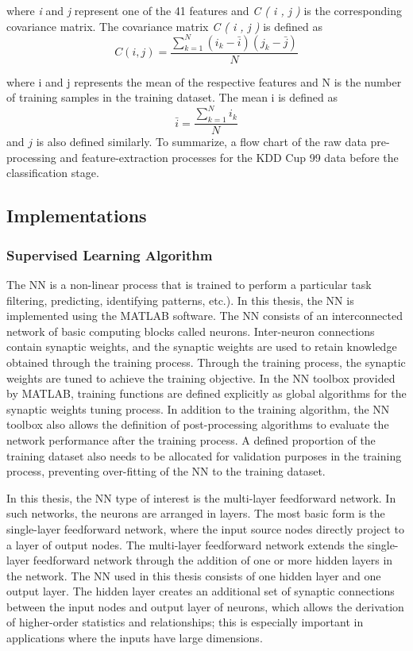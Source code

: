 \documentclass[12pt]{article}
\theoremstyle{definition}
\begin{document}
			where \emph{i} and \emph{j} represent one of the 41 features and \emph{C ( i , j )} is the corresponding covariance matrix. The covariance matrix \emph{C ( i , j )} is defined as
			\begin{equation}
				C(i,j) = \frac{\sum_{k=1}^{N}(i_{k}-\bar{i})(j_{k} - \bar{j})}{N}
			\end{equation}
			
			where i and j represents the mean of the respective features and N is the number of training samples in the training dataset. The mean i is defined as
			\begin{equation}
				\bar{i} = \frac{\sum_{k=1}^{N}i_{k}}{N}
			\end{equation}
			and $j$ is also defined similarly. To summarize, a flow chart of the raw data pre-processing and feature-extraction processes for the KDD Cup 99 data before the classification stage.
			
		\subsection{Implementations}
			\subsubsection{Supervised Learning Algorithm}
			
			The NN is a non-linear process that is trained to perform a particular task filtering, predicting, identifying patterns, etc.). In this thesis, the NN is implemented using the MATLAB software.
			The NN consists of an interconnected network of basic computing blocks called
			neurons. Inter-neuron connections contain synaptic weights, and the synaptic weights are
			used to retain knowledge obtained through the training process. Through the training
			process, the synaptic weights are tuned to achieve the training objective. In the NN
			toolbox provided by MATLAB, training functions are defined explicitly as global
			algorithms for the synaptic weights tuning process. In addition to the training algorithm,
			the NN toolbox also allows the definition of post-processing algorithms to evaluate the
			network performance after the training process. A defined proportion of the training
			dataset also needs to be allocated for validation purposes in the training process,
			preventing over-fitting of the NN to the training dataset.
			
			In this thesis, the NN type of interest is the multi-layer feedforward network. In such networks, the neurons are arranged in layers. The most basic form is the single-layer feedforward network, where the input source nodes directly project to a layer of output nodes. The multi-layer feedforward network extends the single-layer feedforward network through the addition of one or more hidden layers in the network. The NN used in this thesis consists of one hidden layer and one output layer. The hidden layer creates an additional set of synaptic connections between the input nodes and output layer of neurons, which allows the derivation of higher-order statistics and relationships; this is especially important in applications where the inputs have large dimensions.
			
\end{document}
